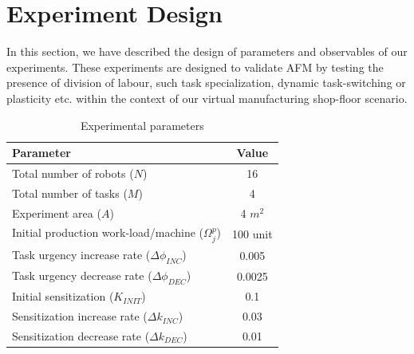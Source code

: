 \documentclass{llncs}
\begin{document}
\section{Experiment Design}
\label{sec:expt-design}
In this section, we have described the design of parameters and observables of our experiments.
These experiments are designed to validate AFM by testing the presence of division of labour, such task specialization, dynamic task-switching or plasticity etc. within the context of our virtual manufacturing shop-floor scenario. 
\begin{table}
\caption{Experimental parameters}
\label{table:params}
\begin{center}
\begin{tabular}{|l||c|}
\hline Parameter & Value\\
\hline Total number of robots ($N$) & 16\\
\hline Total number of tasks ($M$) & 4\\
\hline Experiment area ($A$) & 4 $m^2$\\
\hline Initial production work-load/machine ($\Omega_{j}^{p}$) & 100 unit\\
\hline Task urgency increase rate ($\Delta\phi_{INC}$) & 0.005\\
\hline Task urgency decrease rate ($\Delta\phi_{DEC}$) & 0.0025\\
\hline Initial sensitization ($K_{INIT}$) & 0.1\\
\hline Sensitization increase rate ($\Delta k_{INC}$) & 0.03\\
\hline Sensitization decrease rate ($\Delta k_{DEC}$) & 0.01\\
\hline
\end{tabular}
\end{center}
\end{table}
% 
\end{document}
